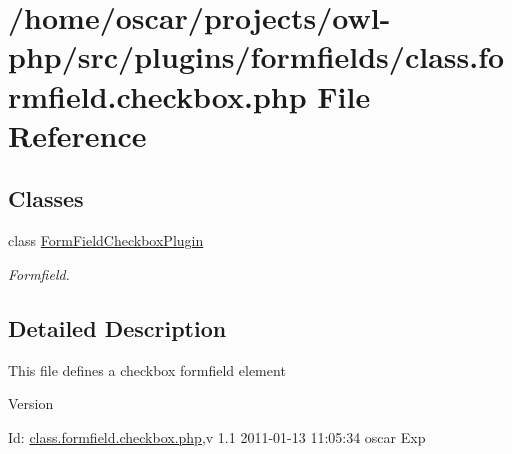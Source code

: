 \section{/home/oscar/projects/owl-\/php/src/plugins/formfields/class.formfield.checkbox.php File Reference}
\label{class_8formfield_8checkbox_8php}
\subsection*{Classes}
\begin{DoxyCompactItemize}
\item 
class \hyperlink{classFormFieldCheckboxPlugin}{FormFieldCheckboxPlugin}
\begin{DoxyCompactList}\small\item\em Formfield. \item\end{DoxyCompactList}\end{DoxyCompactItemize}


\subsection{Detailed Description}
This file defines a checkbox formfield element \begin{DoxyVersion}{Version}

\end{DoxyVersion}
\begin{DoxyParagraph}{Id:}
\hyperlink{class_8formfield_8checkbox_8php}{class.formfield.checkbox.php},v 1.1 2011-\/01-\/13 11:05:34 oscar Exp 
\end{DoxyParagraph}
